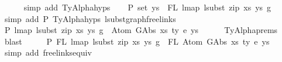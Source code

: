 \begin{isabellebody}
\ \ \ \ \isamarkupfalse%
\ {\isacharparenleft}{\kern0pt}simp\ add{\isacharcolon}{\kern0pt}\ TyAlpha{\isachardot}{\kern0pt}hyps{\isacharparenleft}{\kern0pt}{}{\isacharparenright}{\kern0pt}{\isacharparenright}{\kern0pt}\isanewline
\ \ \isamarkupfalse%
\ P{}{\isacharcolon}{\kern0pt}\ {\isachardoublequoteopen}set\ ys{\isacharprime}{\kern0pt}\ {\isacharequal}{\kern0pt}\ FL\ {\isacharparenleft}{\kern0pt}lmap\ {\isacharparenleft}{\kern0pt}lsubst\ {\isacharparenleft}{\kern0pt}zip\ xs{\isacharprime}{\kern0pt}\ ys{\isacharprime}{\kern0pt}{\isacharparenright}{\kern0pt}{\isacharparenright}{\kern0pt}\ g{\isacharparenright}{\kern0pt}{\isachardoublequoteclose}\isanewline
\ \ \ \ \isamarkupfalse%
\ {\isacharparenleft}{\kern0pt}simp\ add{\isacharcolon}{\kern0pt}\ P{}\ TyAlpha{\isachardot}{\kern0pt}hyps{\isacharparenleft}{\kern0pt}{}{\isacharcomma}{\kern0pt}{}{\isacharparenright}{\kern0pt}\ lsubst{\isacharunderscore}{\kern0pt}graph{\isacharunderscore}{\kern0pt}freelinks{\isacharparenright}{\kern0pt}\isanewline
\ \ \isamarkupfalse%
\ P{}{\isacharcolon}{\kern0pt}\ {\isachardoublequoteopen}lmap\ {\isacharparenleft}{\kern0pt}lsubst\ {\isacharparenleft}{\kern0pt}zip\ xs{\isacharprime}{\kern0pt}\ ys{\isacharprime}{\kern0pt}{\isacharparenright}{\kern0pt}{\isacharparenright}{\kern0pt}\ g\ {\isasymsimeq}\ Atom\ {\isacharparenleft}{\kern0pt}GAbs\ xs\ ty{}\ e{\isacharparenright}{\kern0pt}\ ys{\isachardoublequoteclose}\isanewline
\ \ \ \ \isamarkupfalse%
\ TyAlpha{\isachardot}{\kern0pt}prems\ \isamarkupfalse%
\ blast\isanewline
\ \ \isamarkupfalse%
\ \isamarkupfalse%
\ P{}{\isacharcolon}{\kern0pt}\ {\isachardoublequoteopen}FL\ {\isacharparenleft}{\kern0pt}lmap\ {\isacharparenleft}{\kern0pt}lsubst\ {\isacharparenleft}{\kern0pt}zip\ xs{\isacharprime}{\kern0pt}\ ys{\isacharprime}{\kern0pt}{\isacharparenright}{\kern0pt}{\isacharparenright}{\kern0pt}\ g{\isacharparenright}{\kern0pt}\ {\isacharequal}{\kern0pt}\ FL\ {\isacharparenleft}{\kern0pt}Atom\ {\isacharparenleft}{\kern0pt}GAbs\ xs\ ty{}\ e{\isacharparenright}{\kern0pt}\ ys{\isacharparenright}{\kern0pt}{\isachardoublequoteclose}\isanewline
\ \ \ \ \isamarkupfalse%
\ {\isacharparenleft}{\kern0pt}simp\ add{\isacharcolon}{\kern0pt}\ freelinks{\isacharunderscore}{\kern0pt}equiv{\isacharparenright}{\kern0pt}\isanewline
\ \ \isamarkupfalse%
\ \isamarkupfalse%

\end{isabellebody}
